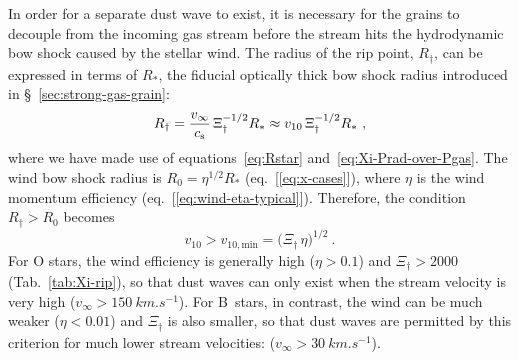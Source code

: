In order for a separate dust wave to exist, it is necessary for the
grains to decouple from the incoming gas stream before the stream hits
the hydrodynamic bow shock caused by the stellar wind.  The radius of
the rip point, \(R_\dag\), can be expressed in terms of \(R_*\), the
fiducial optically thick bow shock radius introduced in
\S~\ref{sec:strong-gas-grain}:
\begin{equation}
  \label{eq:Rdag-over-Rstar}
  R_\dag = \frac{v_\infty}{c_{\text{s}}}\, \Xi_\dag^{-1/2} R_* \approx v_{10}\, \Xi_\dag^{-1/2} R_* \ ,
\end{equation}
where we have made use of equations~\eqref{eq:Rstar}
and~\eqref{eq:Xi-Prad-over-Pgas}.  The wind bow shock radius is
\(R_0 = \eta^{1/2} R_*\) (eq.~[\ref{eq:x-cases}]), where \(\eta\) is the
wind momentum efficiency (eq.~[\ref{eq:wind-eta-typical}]).
Therefore, the condition \(R_\dag > R_0\) becomes
\begin{equation}
  \label{eq:dust-wave-velocity-condition}
  v_{10} > v_{10,\text{min}} = \bigl( \Xi_\dag \, \eta \bigr)^{1/2} \ . 
\end{equation}
For O stars, the wind efficiency is generally high (\(\eta > 0.1\)) and
\(\Xi_\dag > 2000\) (Tab.~\ref{tab:Xi-rip}), so that dust waves can only
exist when the stream velocity is very high
(\(v_\infty > \SI{150}{km.s^{-1}}\)).  For B~stars, in contrast, the wind
can be much weaker (\(\eta < 0.01\)) and \(\Xi_\dag\) is also smaller, so
that dust waves are permitted by this criterion for much lower stream
velocities: (\(v_\infty > \SI{30}{km.s^{-1}}\)).


